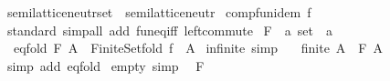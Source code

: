 \begin{isabellebody}
%
\endisatagproof
{\isafoldproof}%
%
\isadelimproof
\isanewline
%
\endisadelimproof
\isanewline
{}\isamarkupfalse%
%
\isadelimdocument
%
\endisadelimdocument
%
\isatagdocument
%
\isamarkuptrue%
%
\endisatagdocument
{\isafolddocument}%
%
\isadelimdocument
%
\endisadelimdocument
{}\isamarkupfalse%
\ semilattice{\isacharunderscore}{\kern0pt}neutr{\isacharunderscore}{\kern0pt}set\ {\isacharequal}{\kern0pt}\ semilattice{\isacharunderscore}{\kern0pt}neutr\isanewline
{}\isanewline
\isanewline
{}\isamarkupfalse%
\ comp{\isacharunderscore}{\kern0pt}fun{\isacharunderscore}{\kern0pt}idem\ f\isanewline
%
\isadelimproof
\ \ %
\endisadelimproof
%
\isatagproof
{}\isamarkupfalse%
\ standard\ {\isacharparenleft}{\kern0pt}simp{\isacharunderscore}{\kern0pt}all\ add{\isacharcolon}{\kern0pt}\ fun{\isacharunderscore}{\kern0pt}eq{\isacharunderscore}{\kern0pt}iff\ left{\isacharunderscore}{\kern0pt}commute{\isacharparenright}{\kern0pt}%
\endisatagproof
{\isafoldproof}%
%
\isadelimproof
\isanewline
%
\endisadelimproof
\isanewline
{}\isamarkupfalse%
\ F\ {\isacharcolon}{\kern0pt}{\isacharcolon}{\kern0pt}\ {\isachardoublequoteopen}{\isacharprime}{\kern0pt}a\ set\ {\isasymRightarrow}\ {\isacharprime}{\kern0pt}a{\isachardoublequoteclose}\isanewline
{}\isanewline
\ \ eq{\isacharunderscore}{\kern0pt}fold{\isacharcolon}{\kern0pt}\ {\isachardoublequoteopen}F\ A\ {\isacharequal}{\kern0pt}\ Finite{\isacharunderscore}{\kern0pt}Set{\isachardot}{\kern0pt}fold\ f\ \ A{\isachardoublequoteclose}\isanewline
\isanewline
{}\isamarkupfalse%
\ infinite\ {\isacharbrackleft}{\kern0pt}simp{\isacharbrackright}{\kern0pt}{\isacharcolon}{\kern0pt}\isanewline
\ \ {\isachardoublequoteopen}{\isasymnot}\ finite\ A\ {\isasymLongrightarrow}\ F\ A\ {\isacharequal}{\kern0pt}\ \isanewline
%
\isadelimproof
\ \ %
\endisadelimproof
%
\isatagproof
{}\isamarkupfalse%
\ {\isacharparenleft}{\kern0pt}simp\ add{\isacharcolon}{\kern0pt}\ eq{\isacharunderscore}{\kern0pt}fold{\isacharparenright}{\kern0pt}%
\endisatagproof
{\isafoldproof}%
%
\isadelimproof
\isanewline
%
\endisadelimproof
\isanewline
{}\isamarkupfalse%
\ empty\ {\isacharbrackleft}{\kern0pt}simp{\isacharbrackright}{\kern0pt}{\isacharcolon}{\kern0pt}\isanewline
\ \ {\isachardoublequoteopen}F\ {\isacharbraceleft}{\kern0pt}{\isacharbraceright}{\kern0pt}\ {\isacharequal}{\kern0pt}\ \isanewline

\end{isabellebody}
